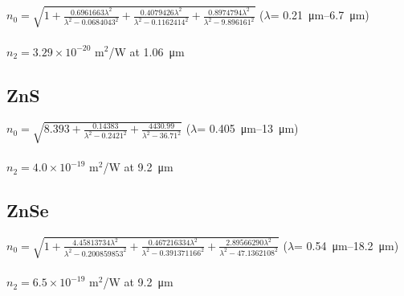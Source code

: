 \subsection*{}
$n_0=\sqrt{1+\frac{0.6961663\lambda^2}{\lambda^2-0.0684043^2}+\frac{0.4079426\lambda^2}{\lambda^2-0.1162414^2}+\frac{0.8974794\lambda^2}{\lambda^2-9.896161^2}}$ (\(\lambda\)= \SIrange{0.21}{6.7}{\micro\meter}) \cite{Malitson-1965}\\
\\
$n_2 = 3.29\times 10^{-20}$ m$^2$/W at \SI{1.06}{\micro\meter} \cite{Sheik-Bahae-1991}

\subsection*{ZnS}
$n_0=\sqrt{8.393+\frac{0.14383}{\lambda^2-0.2421^{2}}+\frac{4430.99}{\lambda^2-36.71^{2}}}$ (\(\lambda\)= \SIrange{0.405}{13}{\micro\meter}) \cite{Klein-1986}\\
\\
$n_2 = 4.0\times 10^{-19}$ m$^2$/W at \SI{9.2}{\micro\meter} \cite{Polyanskiy-2024}

\subsection*{ZnSe}
$n_0=\sqrt{1+\frac{4.45813734\lambda^2}{\lambda^2-0.200859853^2}+\frac{0.467216334\lambda^2}{\lambda^2-0.391371166^2}+\frac{2.89566290\lambda^2}{\lambda^2-47.1362108^2}}$ (\(\lambda\)= \SIrange{0.54}{18.2}{\micro\meter}) \cite{Tatian-1984}\\
\\
$n_2 = 6.5\times 10^{-19}$ m$^2$/W at \SI{9.2}{\micro\meter} \cite{Polyanskiy-2024}
